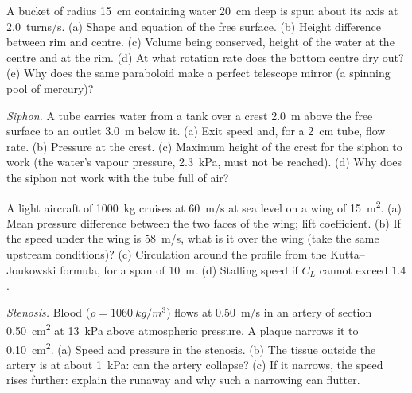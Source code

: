 \begin{exercise}[$\star\star$]\label{exo:b2:euler-bernoulli:6}
A bucket of radius \qty{15}{cm} containing water \qty{20}{cm} deep is spun
about its axis at \qty{2.0}{turns/s}. (a) Shape and equation of the free
surface. (b) Height difference between rim and centre. (c) Volume being
conserved, height of the water at the centre and at the rim. (d) At
what rotation rate does the bottom centre dry out? (e) Why does the
same paraboloid make a perfect telescope mirror (a spinning pool of
mercury)?
\end{exercise}

\begin{exercise}[$\star\star$]\label{exo:b2:euler-bernoulli:7}
\emph{Siphon.} A tube carries water from a tank over a crest \qty{2.0}{m}
above the free surface to an outlet \qty{3.0}{m} below it. (a) Exit speed
and, for a \qty{2}{cm} tube, flow rate. (b) Pressure at the crest. (c)
Maximum height of the crest for the siphon to work (the water's vapour
pressure, \qty{2.3}{kPa}, must not be reached). (d) Why does the siphon
not work with the tube full of air?
\end{exercise}

\begin{exercise}[$\star\star$]\label{exo:b2:euler-bernoulli:8}
A light aircraft of \qty{1000}{kg} cruises at \qty{60}{m/s} at sea level on
a wing of \qty{15}{m^2}. (a) Mean pressure difference between the two
faces of the wing; lift coefficient. (b) If the speed under the wing is
\qty{58}{m/s}, what is it over the wing (take the same upstream
conditions)? (c) Circulation around the profile from the
Kutta--Joukowski formula, for a span of \qty{10}{m}. (d) Stalling speed if
$C_L$ cannot exceed $1.4$.
\end{exercise}

\begin{exercise}[$\star\star$]\label{exo:b2:euler-bernoulli:9}
\emph{Stenosis.} Blood ($\rho = \qty{1060}{kg/m^3}$) flows at \qty{0.50}{m/s}
in an artery of section \qty{0.50}{cm^2} at \qty{13}{kPa} above atmospheric
pressure. A plaque narrows it to \qty{0.10}{cm^2}. (a) Speed and pressure
in the stenosis. (b) The tissue outside the artery is at about
\qty{1}{kPa}: can the artery collapse? (c) If it narrows, the speed
rises further: explain the runaway and why such a narrowing can flutter.
\end{exercise}

